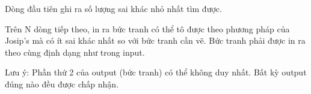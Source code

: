 Dòng đầu tiên ghi ra số lượng sai khác nhỏ nhất tìm được.  

   Trên N dòng tiếp theo, in ra bức tranh có thể tô được theo phương pháp của Josip's mà có ít sai khác nhất so với bức tranh cần vẽ. Bức tranh phải được in ra theo cùng định dạng như trong input.  

   Lưu ý: Phần thứ 2 của output (bức tranh) có thể không duy nhất. Bất kỳ output đúng nào đều được chấp nhận.
